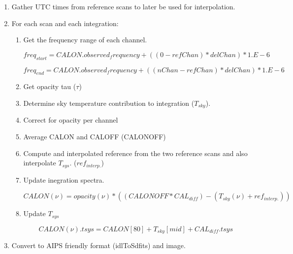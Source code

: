 \documentclass[11pt]{article}
\begin{document}
\begin{enumerate}

\item Gather UTC times from reference scans to later be used for interpolation.

\item For each scan and each integration:

\begin{enumerate}

\item Get the frequency range of each channel.

\begin{equation}
freq_{start} = CALON.observed_frequency + ( (0-refChan) * delChan ) * 1.E-6
\end{equation}

\begin{equation}
freq_{end} = CALON.observed_frequency +  ( (nChan-refChan) * delChan ) * 1.E-6
\end{equation}

\item Get opacity tau ($\tau$)

\item Determine sky temperature contribution to integration ($T_{sky}$).

\item Correct for opacity per channel

\item Average CALON and CALOFF (CALONOFF)

\item Compute and interpolated reference from the two reference scans and also interpolate $T_{sys}$. ($ref_{interp.}$)

\item Update inegration spectra.

\begin{equation}
CALON(\nu) = opacity(\nu)* ((CALONOFF * CAL_{diff}) - (T_{sky}(\nu) + ref_{interp.}))
\end{equation}

\item Update $T_{sys}$

\begin{equation}
CALON(\nu).tsys = CALON[80] + T_{sky}[mid] + CAL_{diff}.tsys
\end{equation}

\end{enumerate}

\item Convert to AIPS friendly format (idlToSdfits) and image.

\end{enumerate}
\end{document}
